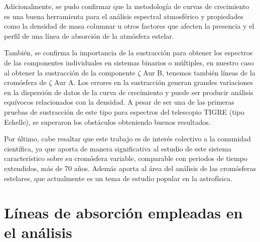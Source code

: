 \documentclass[12pt,oneside,openany,letter]{book}
\begin{document}
Adicionalmente, se pudo confirmar que la metodología de curvas de crecimiento es una buena herramienta para el análisis espectral atmosférico y propiedades como la densidad de masa columnar u otros factores que afecten la presencia y el perfil de una línea de absorción de la atmósfera estelar.

También, se confirma la importancia de la sustracción para obtener los espectros de las componentes individuales en sistemas binarios o múltiples, en nuestro caso al obtener la sustracción de la componente $\zeta$ Aur B, tenemos también líneas de la cromósfera de $\zeta$ Aur A. Los errores en la sustracción generan grandes variaciones en la dispersión de datos de la curva de crecimiento y puede ser producir análisis equívocos relacionados con la densidad. A pesar de ser una de las primeras pruebas de sustracción de este tipo para espectros del telescopio TIGRE (tipo Echelle), se superaron los obstáculos obteniendo buenos resultados.

Por último, cabe resaltar que este trabajo es de interés colectivo a la comunidad científica, ya que aporta de manera significativa al estudio de este sistema característico sobre su cromósfera variable, comparable con periodos de tiempo extendidos, más de 70 años. Además aporta al área del análisis de las cromósferas estelares, que actualmente es un tema de estudio popular en la astrofísica.

\appendix

\chapter{Líneas de absorción empleadas en el análisis}
\end{document}
